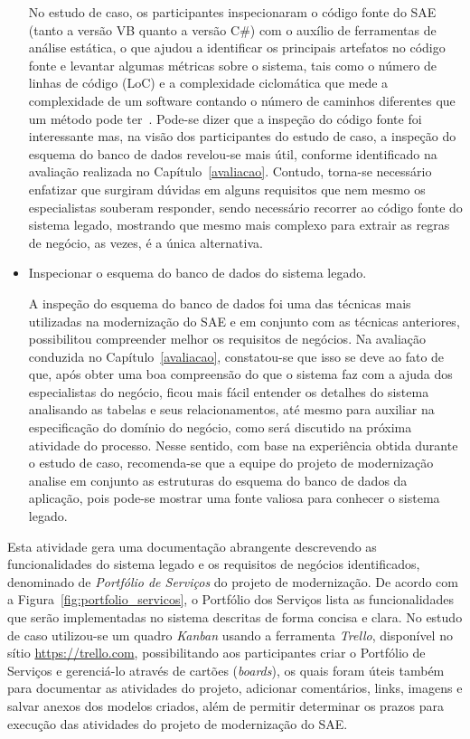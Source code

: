 \begin{itemize}
No estudo de caso, os participantes inspecionaram o
código fonte do \acrshort{SAE} (tanto a versão VB quanto a versão C\#) 
com o auxílio de ferramentas de análise estática,
o que ajudou a identificar os principais
artefatos no código fonte e levantar algumas 
métricas sobre o sistema, tais como o número de linhas de código (LoC) e 
a complexidade ciclomática que 
mede a complexidade de um software contando 
o número de caminhos diferentes que um método 
pode ter~\cite{mccabe1976complexity}.
Pode-se dizer que a inspeção do código fonte 
foi interessante mas, 
na visão dos participantes do estudo de caso,
a inspeção do esquema do banco de dados revelou-se mais útil, 
conforme identificado na avaliação realizada no Capítulo~\ref{avaliacao}.
Contudo, torna-se necessário enfatizar que 
surgiram dúvidas em alguns requisitos que nem
mesmo os especialistas souberam responder, sendo
necessário recorrer
ao código fonte do sistema legado, mostrando que mesmo mais complexo 
para extrair as regras de negócio, as vezes, é a única alternativa.


	\item Inspecionar o esquema do banco de dados do sistema legado.
	
A inspeção do esquema do banco de dados 
foi uma das técnicas 
mais utilizadas na modernização do \acrshort{SAE} e
em conjunto com as técnicas anteriores,
possibilitou compreender melhor os requisitos de negócios. 
Na avaliação conduzida
no Capítulo~\ref{avaliacao}, constatou-se que isso se deve
ao fato de que, após obter uma boa compreensão do que o sistema faz 
com a ajuda dos especialistas do negócio, 
ficou mais fácil entender os detalhes do sistema 
analisando as tabelas e seus relacionamentos, 
até mesmo para auxiliar na especificação do domínio do 
negócio, como será discutido na próxima atividade do processo. 
Nesse sentido, com base na experiência obtida
durante o estudo de caso,
recomenda-se que a equipe do projeto de modernização
analise em conjunto
as estruturas do esquema
do banco de dados da aplicação, 
pois pode-se mostrar uma fonte
valiosa para conhecer o sistema legado.

	

\end{itemize}


 
Esta atividade gera uma documentação 
abrangente descrevendo as 
funcionalidades do sistema legado e os 
requisitos de negócios identificados, 
denominado de \emph{Portfólio de Serviços} 
do projeto de modernização.
De acordo com a Figura~\ref{fig:portfolio_servicos},
o Portfólio dos Serviços 
lista as funcionalidades
que serão implementadas no 
sistema descritas 
de forma concisa e clara. No estudo 
de caso utilizou-se um quadro \emph{Kanban}
usando a ferramenta 
\emph{Trello}, disponível 
no sítio  \url{https://trello.com}, 
possibilitando aos participantes
criar o Portfólio de Serviços
e gerenciá-lo através de cartões (\textit{boards}), os quais
foram úteis também para 
documentar as atividades do projeto,
adicionar comentários, links, imagens e 
salvar anexos dos modelos criados, 
além de permitir determinar os prazos para execução 
das atividades do projeto de modernização do \acrshort{SAE}.


